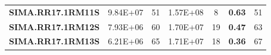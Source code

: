 \documentclass[encoding=utf8,british]{tumphthesis}
\begin{document}
\begin{table}[H]
\begin{subtable}[t]{\textwidth}
{\begin{tabular}{|l|cc|cc|cc|}
\rowcolor[HTML]{9FC5E8} 
\textbf{SIMA.RR17.1RM11S} & 9.84E+07                         & 51                            & 1.57E+08                          & 8                                  & \textbf{0.63}                & 51                      \\
\rowcolor[HTML]{EFEFEF} 
\textbf{SIMA.RR17.1RM12S} & 7.93E+06                         & 60                            & 1.70E+07                          & 19                                 & \textbf{0.47}                & 63                      \\
\rowcolor[HTML]{9FC5E8} 
\textbf{SIMA.RR17.1RM13S} & 6.21E+06                         & 65                            & 1.71E+07                          & 18                                 & \textbf{0.36}                & 67                      \\ \hline
\end{tabular}}
\end{subtable}

\hspace{\fill}


\end{table}
\end{document}

